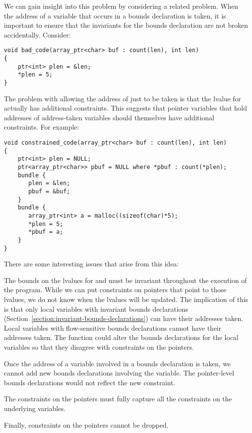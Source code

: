 We can gain insight into this problem by considering a related
problem.   When the address of a variable that occurs in a bounds declaration is 
taken, it is important to ensure that the invariants for the bounds declaration are not
broken accidentally.  Consider:
\begin{lstlisting}
void bad_code(array_ptr<char> buf : count(len), int len) 
{
    ptr<int> plen = &len;
    *plen = 5;
}
\end{lstlisting}
The problem with allowing the address of just  to be taken is
that the lvalue for  actually has additional constraints. This
suggests that pointer variables that hold addresses of address-taken variables should
themselves have additional constraints.  For example:
\begin{lstlisting}
void constrained_code(array_ptr<char> buf : count(len), int len) 
{
    ptr<int> plen = NULL;
    ptr<array_ptr<char>> pbuf = NULL where *pbuf : count(*plen);
    bundle {
       plen = &len;
       pbuf = &buf;
    }
    bundle {
       array_ptr<int> a = malloc((sizeof(char)*5);
       *plen = 5;
       *pbuf = a;
    }
}
\end{lstlisting}
There are some interesting issues that arise from this idea:
\begin{compactitem}
\item The bounds on the lvalues for  and
 must be invariant throughout the execution of the program.
While we can put constraints on pointers that point to those lvalues,
we do not know when the lvalues will be updated.
The implication of this is that only local variables with invariant
bounds declarations (Section~\ref{section:invariant-bounds-declarations})
can have their addresses taken.   Local variables
with flow-sensitive bounds declarations cannot have their addresses taken.
The function could alter the bounds declarations for the local variables
so that they disagree with constraints on the pointers.
\item Once the address of a variable involved in a bounds declaration 
is taken, we cannot add new bounds declarations involving the variable.
The pointer-level bounds declarations would not reflect the new constraint.
\item The constraints on the pointers must fully capture 
all the constraints on the underlying variables.
\item Finally, constraints on the pointers cannot be dropped.
\end{compactitem}

